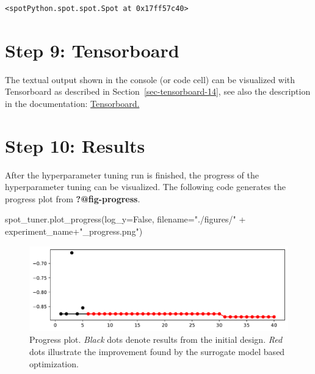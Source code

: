 \documentclass[
  letterpaper,
  DIV=11,
  numbers=noendperiod]{scrreprt}
\newenvironment{Shaded}{\begin{snugshade}}{\end{snugshade}}
\newcommand{\NormalTok}[1]{\textcolor[rgb]{0.00,0.23,0.31}{#1}}
\newcommand{\OperatorTok}[1]{\textcolor[rgb]{0.37,0.37,0.37}{#1}}
\newcommand{\StringTok}[1]{\textcolor[rgb]{0.13,0.47,0.30}{#1}}
\newcommand{\VariableTok}[1]{\textcolor[rgb]{0.07,0.07,0.07}{#1}}
\begin{document}
\begin{verbatim}
<spotPython.spot.spot.Spot at 0x17ff57c40>
\end{verbatim}

\hypertarget{sec-tensorboard-18}{%
\section{Step 9: Tensorboard}\label{sec-tensorboard-18}}

The textual output shown in the console (or code cell) can be visualized
with Tensorboard as described in Section~\ref{sec-tensorboard-14}, see
also the description in the documentation:
\href{https://sequential-parameter-optimization.github.io/spotPython/14_spot_ray_hpt_torch_cifar10.html\#sec-tensorboard-14}{Tensorboard.}

\hypertarget{sec-results-tuning-18}{%
\section{Step 10: Results}\label{sec-results-tuning-18}}

After the hyperparameter tuning run is finished, the progress of the
hyperparameter tuning can be visualized. The following code generates
the progress plot from \textbf{?@fig-progress}.

\begin{Shaded}
\begin{Highlighting}[]
\NormalTok{spot\_tuner.plot\_progress(log\_y}\OperatorTok{=}\VariableTok{False}\NormalTok{,}
\NormalTok{    filename}\OperatorTok{=}\StringTok{"./figures/"} \OperatorTok{+}\NormalTok{ experiment\_name}\OperatorTok{+}\StringTok{"\_progress.png"}\NormalTok{)}
\end{Highlighting}
\end{Shaded}

\begin{figure}[H]

{\centering \includegraphics{18_spot_hpt_sklearn_multiclass_classification_svc_files/figure-pdf/cell-25-output-1.pdf}

}

\caption{Progress plot. \emph{Black} dots denote results from the
initial design. \emph{Red} dots illustrate the improvement found by the
surrogate model based optimization.}

\end{figure}
\end{document}
